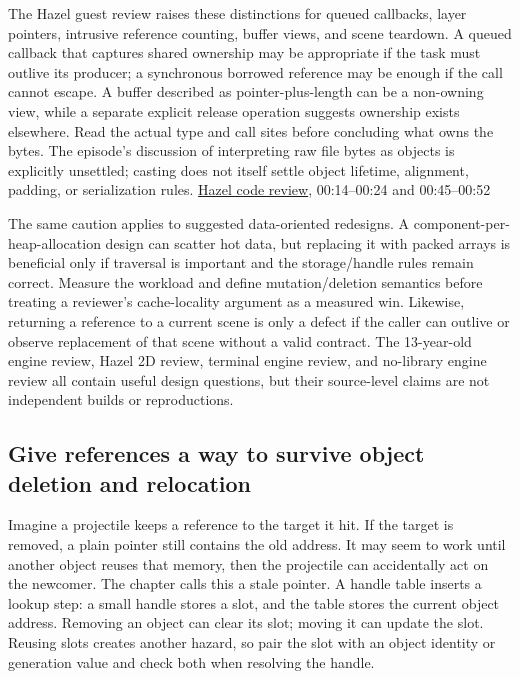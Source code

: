 The Hazel guest review raises these distinctions for queued callbacks, layer pointers, intrusive reference counting, buffer views, and scene teardown. A queued callback that captures shared ownership may be appropriate if the task must outlive its producer; a synchronous borrowed reference may be enough if the call cannot escape. A buffer described as pointer-plus-length can be a non-owning view, while a separate explicit release operation suggests ownership exists elsewhere. Read the actual type and call sites before concluding what owns the bytes. The episode's discussion of interpreting raw file bytes as objects is explicitly unsettled; casting does not itself settle object lifetime, alignment, padding, or serialization rules. \href{https://www.youtube.com/watch?v=Glq1oDBy1cQ}{Hazel code review}, 00:14--00:24 and 00:45--00:52

The same caution applies to suggested data-oriented redesigns. A component-per-heap-allocation design can scatter hot data, but replacing it with packed arrays is beneficial only if traversal is important and the storage/handle rules remain correct. Measure the workload and define mutation/deletion semantics before treating a reviewer's cache-locality argument as a measured win. Likewise, returning a reference to a current scene is only a defect if the caller can outlive or observe replacement of that scene without a valid contract. The 13-year-old engine review, Hazel 2D review, terminal engine review, and no-library engine review all contain useful design questions, but their source-level claims are not independent builds or reproductions.

\subsection{Give references a way to survive object deletion and relocation}\label{05-engine-i-ch014-give-references-a-way-to-survive-object-deletion-and-relocation}

\hypertarget{05-engine-i-ch014-give-references-a-way-to-survive-object-deletion-and-relocation}{}

Imagine a projectile keeps a reference to the target it hit. If the target is removed, a plain pointer still contains the old address. It may seem to work until another object reuses that memory, then the projectile can accidentally act on the newcomer. The chapter calls this a stale pointer. A handle table inserts a lookup step: a small handle stores a slot, and the table stores the current object address. Removing an object can clear its slot; moving it can update the slot. Reusing slots creates another hazard, so pair the slot with an object identity or generation value and check both when resolving the handle.

